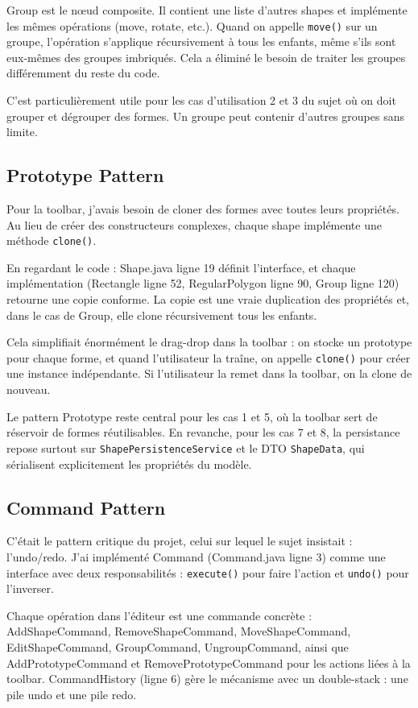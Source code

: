 \documentclass[11pt,a4paper,french]{article}
\begin{document}
Group est le nœud composite. Il contient une liste d'autres shapes et implémente les mêmes opérations (move, rotate, etc.). Quand on appelle \texttt{move()} sur un groupe, l'opération s'applique récursivement à tous les enfants, même s'ils sont eux-mêmes des groupes imbriqués. Cela a éliminé le besoin de traiter les groupes différemment du reste du code.

C'est particulièrement utile pour les cas d'utilisation 2 et 3 du sujet où on doit grouper et dégrouper des formes. Un groupe peut contenir d'autres groupes sans limite.

\subsection{Prototype Pattern}

Pour la toolbar, j'avais besoin de cloner des formes avec toutes leurs propriétés. Au lieu de créer des constructeurs complexes, chaque shape implémente une méthode \texttt{clone()}.

En regardant le code : Shape.java ligne 19 définit l'interface, et chaque implémentation (Rectangle ligne 52, RegularPolygon ligne 90, Group ligne 120) retourne une copie conforme. La copie est une vraie duplication des propriétés et, dans le cas de Group, elle clone récursivement tous les enfants.

Cela simplifiait énormément le drag-drop dans la toolbar : on stocke un prototype pour chaque forme, et quand l'utilisateur la traîne, on appelle \texttt{clone()} pour créer une instance indépendante. Si l'utilisateur la remet dans la toolbar, on la clone de nouveau.

Le pattern Prototype reste central pour les cas 1 et 5, où la toolbar sert de réservoir de formes réutilisables. En revanche, pour les cas 7 et 8, la persistance repose surtout sur \texttt{ShapePersistenceService} et le DTO \texttt{ShapeData}, qui sérialisent explicitement les propriétés du modèle.

\subsection{Command Pattern}

C'était le pattern critique du projet, celui sur lequel le sujet insistait : l'undo/redo. J'ai implémenté Command (Command.java ligne 3) comme une interface avec deux responsabilités : \texttt{execute()} pour faire l'action et \texttt{undo()} pour l'inverser.

Chaque opération dans l'éditeur est une commande concrète : AddShapeCommand, RemoveShapeCommand, MoveShapeCommand, EditShapeCommand, GroupCommand, UngroupCommand, ainsi que AddPrototypeCommand et RemovePrototypeCommand pour les actions liées à la toolbar. CommandHistory (ligne 6) gère le mécanisme avec un double-stack : une pile undo et une pile redo.
\end{document}
